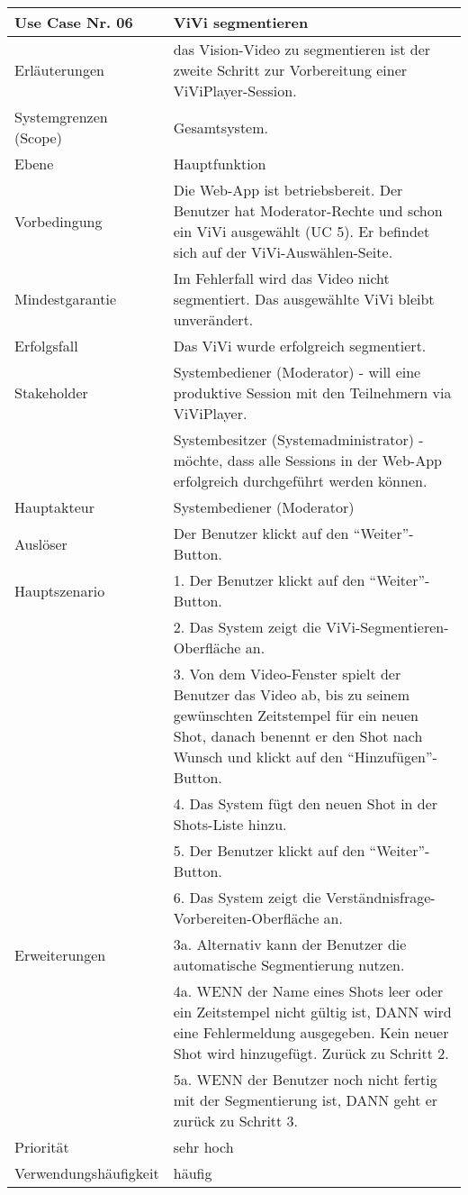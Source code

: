 \begin{tabularx}{\linewidth}{|l|X|}
	\hline
	Use Case Nr. 06			& \textbf{ViVi segmentieren} \\ \hline
	Erläuterungen			& das Vision-Video zu segmentieren ist der zweite Schritt zur
							  Vorbereitung einer ViViPlayer-Session. \\ \hline
	Systemgrenzen (Scope)	& Gesamtsystem. \\ \hline
	Ebene					& Hauptfunktion \\ \hline
	Vorbedingung			& Die Web-App ist betriebsbereit. Der Benutzer hat 
	                          Moderator-Rechte und schon ein ViVi ausgewählt (UC 5). Er befindet sich auf der ViVi-Auswählen-Seite. \\ \hline
	Mindestgarantie			& Im Fehlerfall wird das Video nicht segmentiert. Das ausgewählte 
							  ViVi bleibt unverändert. \\ \hline
	Erfolgsfall 			& Das ViVi wurde erfolgreich segmentiert. \\ \hline
	Stakeholder				& Systembediener (Moderator) - will eine produktive Session mit den 
	                          Teilnehmern via ViViPlayer. \\
							& Systembesitzer (Systemadministrator) - möchte, dass alle Sessions 
							  in der Web-App erfolgreich durchgeführt werden können. \\ \hline
	Hauptakteur				& Systembediener (Moderator) \\ \hline
	Auslöser				& Der Benutzer klickt auf den ``Weiter''-Button. \\ \hline	
	Hauptszenario			& 1. Der Benutzer klickt auf den ``Weiter''-Button. \\
							& 2. Das System zeigt die ViVi-Segmentieren-Oberfläche an. \\
							& 3. Von dem Video-Fenster spielt der Benutzer das Video ab, bis 
							  zu seinem gewünschten Zeitstempel für ein neuen Shot, danach
							  benennt er den Shot nach Wunsch und klickt auf den ``Hinzufügen''-Button. \\
							& 4. Das System fügt den neuen Shot in der Shots-Liste
							  hinzu. \\
							& 5. Der Benutzer klickt auf den ``Weiter''-Button. \\
							& 6. Das System zeigt die Verständnisfrage-Vorbereiten-Oberfläche 
							  an. \\ \hline
	Erweiterungen			& 3a. Alternativ kann der Benutzer die automatische 
							  Segmentierung nutzen. \\
							& 4a. WENN der Name eines Shots leer oder ein Zeitstempel
							  nicht gültig ist, DANN wird eine Fehlermeldung ausgegeben. Kein neuer Shot wird hinzugefügt. Zurück zu Schritt 2. \\
							& 5a. WENN der Benutzer noch nicht fertig mit der Segmentierung
							  ist, DANN geht er zurück zu Schritt 3. \\ \hline
	Priorität				& sehr hoch \\ \hline
	Verwendungshäufigkeit	& häufig \\ \hline
\end{tabularx}